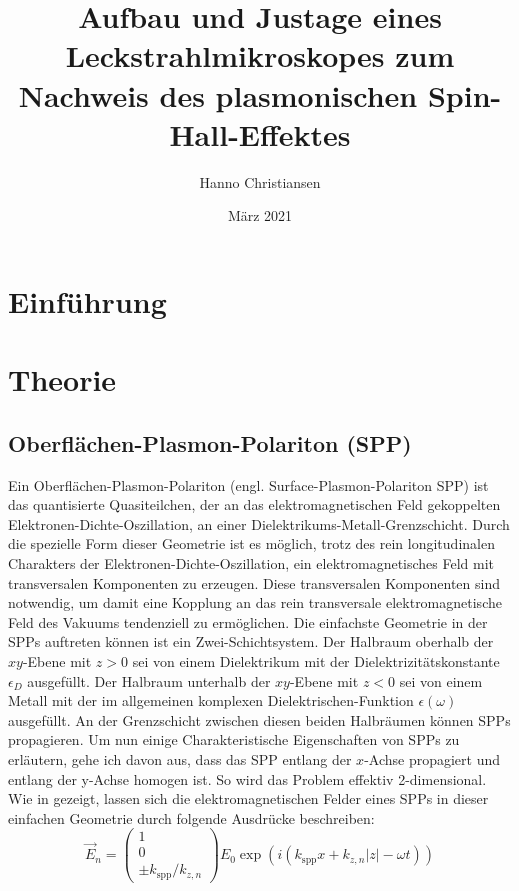 \documentclass{article}
\title{Aufbau und Justage eines Leckstrahlmikroskopes zum Nachweis des plasmonischen Spin-Hall-Effektes}
\author{Hanno Christiansen}
\date{März 2021}
\begin{document}
	
\maketitle
\tableofcontents

\section{Einführung}
\section{Theorie}
	\subsection{Oberflächen-Plasmon-Polariton (SPP)}		
	Ein Oberflächen-Plasmon-Polariton (engl. Surface-Plasmon-Polariton SPP) ist das quantisierte Quasiteilchen, der an das elektromagnetischen Feld gekoppelten Elektronen-Dichte-Oszillation, an einer Dielektrikums-Metall-Grenzschicht. Durch die spezielle Form dieser Geometrie ist es möglich, trotz des rein longitudinalen Charakters der Elektronen-Dichte-Oszillation, ein elektromagnetisches Feld mit transversalen Komponenten zu erzeugen. Diese transversalen Komponenten sind notwendig, um  damit eine Kopplung an das rein transversale elektromagnetische Feld des Vakuums tendenziell zu ermöglichen. Die einfachste Geometrie in der SPPs auftreten können ist ein Zwei-Schichtsystem. Der Halbraum oberhalb der $xy$-Ebene mit $z>0$ sei von einem Dielektrikum mit der Dielektrizitätskonstante $\epsilon_D$ ausgefüllt. Der Halbraum unterhalb der $xy$-Ebene mit $z<0$ sei von einem Metall mit der im allgemeinen komplexen Dielektrischen-Funktion $\epsilon(\omega)$ ausgefüllt. An der Grenzschicht zwischen diesen beiden Halbräumen können SPPs propagieren. Um nun einige Charakteristische Eigenschaften von SPPs zu erläutern, gehe ich davon aus, dass das SPP entlang der $x$-Achse propagiert und entlang der y-Achse homogen ist. So wird das Problem effektiv 2-dimensional. Wie in \cite{Maier.2007} gezeigt, lassen sich die elektromagnetischen Felder eines SPPs in dieser einfachen Geometrie durch folgende Ausdrücke beschreiben:
	\begin{equation}
		\label{eq:electric_field_spp}
		\vec{E}_n = \begin{pmatrix} 1 \\ 0 \\ \pm k_{\mathrm{spp}}/k_{z,n} \end{pmatrix} E_0 \exp\left(i(k_{\mathrm{spp}}x + k_{z, n}|z|-\omega t)\right)	
	\end{equation}
\end{document}
